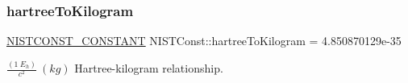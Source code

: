 \subsubsection{\texorpdfstring{hartree\+To\+Kilogram}{hartreeToKilogram}}
{\footnotesize\ttfamily \mbox{\hyperlink{_n_i_s_t_const_8hpp_a2b0fc1d7452373f816175dd86ce26729}{N\+I\+S\+T\+C\+O\+N\+S\+T\+\_\+\+C\+O\+N\+S\+T\+A\+NT}} N\+I\+S\+T\+Const\+::hartree\+To\+Kilogram = 4.\+850870129e-\/35}

$\frac{(1\ E_h)}{c^2} \ (kg)$ Hartree-\/kilogram relationship. 